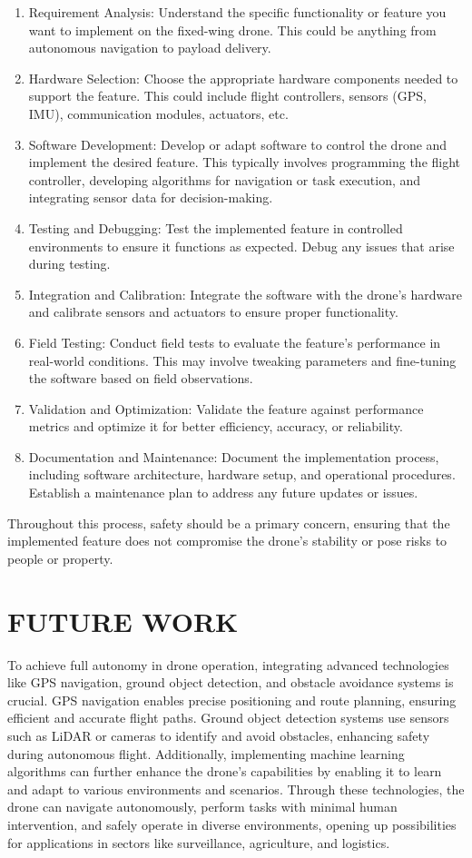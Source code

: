 \documentclass[conference]{IEEEtran}
\begin{document}
\begin{enumerate}

    \item Requirement Analysis: Understand the specific functionality or feature you want to implement on the fixed-wing drone. This could be anything from autonomous navigation to payload delivery.
    \item Hardware Selection: Choose the appropriate hardware components needed to support the feature. This could include flight controllers, sensors (GPS, IMU), communication modules, actuators, etc.
    \item Software Development: Develop or adapt software to control the drone and implement the desired feature. This typically involves programming the flight controller, developing algorithms for navigation or task execution, and integrating sensor data for decision-making.
    \item Testing and Debugging: Test the implemented feature in controlled environments to ensure it functions as expected. Debug any issues that arise during testing.
    \item Integration and Calibration: Integrate the software with the drone's hardware and calibrate sensors and actuators to ensure proper functionality.
    \item Field Testing: Conduct field tests to evaluate the feature's performance in real-world conditions. This may involve tweaking parameters and fine-tuning the software based on field observations.
    \item Validation and Optimization: Validate the feature against performance metrics and optimize it for better efficiency, accuracy, or reliability.
    \item Documentation and Maintenance: Document the implementation process, including software architecture, hardware setup, and operational procedures. Establish a maintenance plan to address any future updates or issues. 
\end{enumerate}
Throughout this process, safety should be a primary concern, ensuring that the implemented feature does not compromise the drone's stability or pose risks to people or property\cite{zhao2021design}.

\section{FUTURE WORK}
To achieve full autonomy in drone operation, integrating advanced technologies like GPS navigation, ground object detection, and obstacle avoidance systems is crucial. GPS navigation enables precise positioning and route planning, ensuring efficient and accurate flight paths. Ground object detection systems use sensors such as LiDAR or cameras to identify and avoid obstacles, enhancing safety during autonomous flight. Additionally, implementing machine learning algorithms can further enhance the drone's capabilities by enabling it to learn and adapt to various environments and scenarios. Through these technologies, the drone can navigate autonomously, perform tasks with minimal human intervention, and safely operate in diverse environments, opening up possibilities for applications in sectors like surveillance, agriculture, and logistics.
\end{document}

